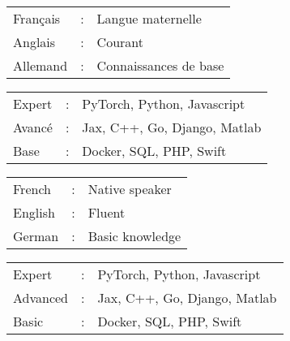 \ifFrench
  \color{deepgray}
  \small
  \begin{tabular}{@{}l@{}ll@{}}
    Français & : & Langue maternelle     \\
    Anglais &:  & Courant               \\
    Allemand &: & Connaissances de base
  \end{tabular}
  \commonvspace
  \color{deepgray}
  \small
  \begin{tabular}{@{}l@{}ll@{}}
    Expert & : & PyTorch, Python, Javascript  \\
    Avancé & : & Jax, C++, Go, Django, Matlab  \\
    Base & : & Docker, SQL, PHP, Swift
  \end{tabular}
\else
  \color{deepgray}
  \small
  \begin{tabular}{@{}l@{}ll@{}}
    French&:  & Native speaker  \\
    English&: & Fluent          \\
    German&:  & Basic knowledge
  \end{tabular}
  \commonvspace
  \color{deepgray}
  \small
  \begin{tabular}{@{}l@{}ll@{}}
    Expert & : & PyTorch, Python, Javascript  \\
    Advanced & : & Jax, C++, Go, Django, Matlab  \\
    Basic & : & Docker, SQL, PHP, Swift
  \end{tabular}
\fi